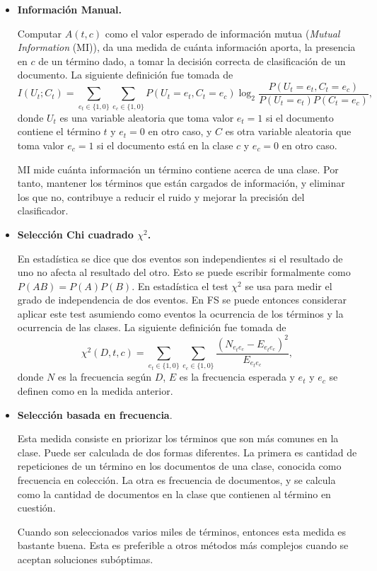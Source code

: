 \documentclass{llncs}
\begin{document}
		\begin{itemize}
			\item\textbf{Informaci\'on Manual.}
			\smallskip
			
				Computar $A(t,c)$ como el valor esperado de informaci\'on mutua (\emph{Mutual Information} (MI)), da una medida de cu\'anta informaci\'on aporta, la presencia en $c$ de un t\'ermino dado, a tomar la decisi\'on correcta de clasificaci\'on de un documento. La siguiente definici\'on fue tomada de \cite[Ecuaci\'on 13.16]{B1}
				\[
					I(U_t;C_t) = \sum_{e_t \in \{ 1,0 \} } \sum_{e_c \in \{ 1,0 \} } P( U_t = e_t, C_t = e_c) \log_2 \frac{P (U_t = e_t, C_t = e_c) }{ P(U_t = e_t) P(C_t = e_c) },
				\]
				donde $U_t$ es una variable aleatoria que toma valor $e_t = 1$ si el documento contiene el t\'ermino $t$ y $e_t = 0$ en otro caso, y $C$ es otra variable aleatoria que toma valor $e_c = 1$ si el documento est\'a en la clase $c$ y $e_c = 0  $ en otro caso. 
				
				\smallskip
	
				MI mide cu\'anta informaci\'on un t\'ermino contiene acerca de una clase. Por tanto, mantener los t\'erminos que est\'an cargados de informaci\'on, y eliminar los que no, contribuye a reducir el ruido y mejorar la precisi\'on del clasificador.
	
			\smallskip
			\item\textbf{Selecci\'on Chi cuadrado $\chi^2$.} 
			\smallskip
			
			En estad\'istica se dice que dos eventos son independientes si el resultado de uno no afecta al resultado del otro. Esto se puede escribir formalmente como $P(AB) = P(A) P(B)$. En estad\'istica el test $\chi^2$ se usa para medir el grado de independencia de dos eventos. En FS se puede entonces considerar aplicar este test asumiendo como eventos la ocurrencia de los t\'erminos y la ocurrencia de las clases.  La siguiente definici\'on fue tomada de \cite[Ecuaci\'on 13.18]{B1}
			\[
				\chi^2(D,t,c) = \sum_{e_t\in \{ 1, 0 \}} \sum_{e_c\in \{ 1, 0 \}} \frac{(N_{e_te_c} - E_{e_t e_c}) ^2 } { E_{e_t e_c}},
			\]
			donde $N$ es la frecuencia seg\'un $D$, $E$ es la frecuencia esperada y $e_t$ y  $e_c$ se definen como en la medida anterior.
			
			\smallskip
			\item \textbf{Selecci\'on basada en frecuencia}.
			\smallskip
			
			 Esta medida consiste en priorizar los t\'erminos que son m\'as comunes en la  clase. Puede ser calculada de dos formas diferentes. La primera es cantidad de repeticiones de un t\'ermino en los documentos de una clase, conocida como frecuencia en colecci\'on. La otra es frecuencia de documentos, y se calcula como la cantidad de documentos en la clase que contienen al t\'ermino en cuesti\'on.
			
			\smallskip
				
			Cuando son seleccionados varios miles de t\'erminos, entonces esta medida es bastante buena. Esta es preferible a otros m\'etodos m\'as complejos cuando se aceptan soluciones sub\'optimas.
			
		\end{itemize}
	
\end{document}
